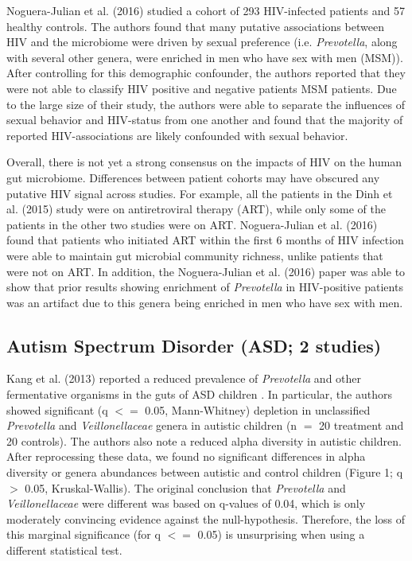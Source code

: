 {Noguera-Julian et al. (2016) studied a cohort of 293 HIV-infected patients and 57 healthy controls.
The authors found that many putative associations between HIV and the microbiome were driven by sexual preference (i.e. \textit{Prevotella}, along with several other genera, were enriched in men who have sex with men (MSM)).
After controlling for this demographic confounder, the authors reported that they were not able to classify HIV positive and negative patients MSM patients.
Due to the large size of their study, the authors were able to separate the influences of sexual behavior and HIV-status from one another and found that the majority of reported HIV-associations are likely confounded with sexual behavior.

Overall, there is not yet a strong consensus on the impacts of HIV on the human gut microbiome.
Differences between patient cohorts may have obscured any putative HIV signal across studies.
For example, all the patients in the Dinh et al. (2015) study were on antiretroviral therapy (ART), while only some of the patients in the other two studies were on ART.
Noguera-Julian et al. (2016) found that patients who initiated ART within the first 6 months of HIV infection were able to maintain gut microbial community richness, unlike patients that were not on ART.
In addition, the Noguera-Julian et al. (2016) paper was able to show that prior results showing enrichment of \textit{Prevotella} in HIV-positive patients was an artifact due to this genera being enriched in men who have sex with men.

\subsection*{Autism Spectrum Disorder (ASD; 2 studies)}

Kang et al. (2013) reported a reduced prevalence of \textit{Prevotella} and other fermentative organisms in the guts of ASD children \cite{asd-kb}.
In particular, the authors showed significant (q $<=$ 0.05, Mann-Whitney) depletion in unclassified \textit{Prevotella} and \textit{Veillonellaceae} genera in autistic children (n $=$ 20 treatment and 20 controls).
The authors also note a reduced alpha diversity in autistic children.
After reprocessing these data, we found no significant differences in alpha diversity or genera abundances between autistic and control children (Figure 1; q $>$ 0.05, Kruskal-Wallis).
The original conclusion that \textit{Prevotella} and \textit{Veillonellaceae} were different was based on q-values of 0.04, which is only moderately convincing evidence against the null-hypothesis.
Therefore, the loss of this marginal significance (for q $<=$ 0.05) is unsurprising when using a different statistical test.

}
